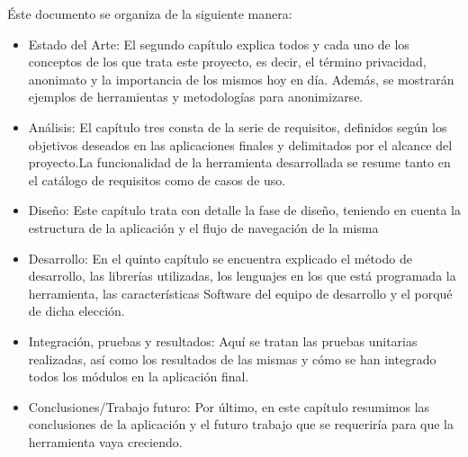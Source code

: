 Éste documento se organiza de la siguiente manera:
\begin{itemize}
  \item Estado del Arte: El segundo capítulo explica todos y cada uno
    de los conceptos de los que trata este proyecto, es decir, el
    término privacidad, anonimato y la importancia de los mismos hoy
    en día. Además, se mostrarán ejemplos de herramientas y
    metodologías para anonimizarse.
  \item Análisis: El capítulo tres consta de la serie de requisitos,
    definidos según los objetivos deseados en las aplicaciones finales
    y delimitados por el alcance del proyecto.La funcionalidad de la
    herramienta desarrollada se resume tanto en el catálogo de
    requisitos como de casos de uso.
  \item Diseño: Este capítulo trata con detalle la fase de diseño,
    teniendo en cuenta la estructura de la aplicación y el flujo de
    navegación de la misma
  \item Desarrollo: En el quinto capítulo se encuentra explicado el
    método de desarrollo, las librerías utilizadas, los lenguajes en
    los que está programada la herramienta, las características
    Software del equipo de desarrollo y el porqué de dicha elección.
  \item Integración, pruebas y resultados: Aquí se tratan las pruebas
    unitarias realizadas, así como los resultados de las mismas y cómo
    se han integrado todos los módulos en la aplicación final.
  \item Conclusiones/Trabajo futuro: Por último, en este capítulo
    resumimos las conclusiones de la aplicación y el futuro trabajo
    que se requeriría para que la herramienta vaya creciendo.
\end{itemize}

\newpage \thispagestyle{empty} %
